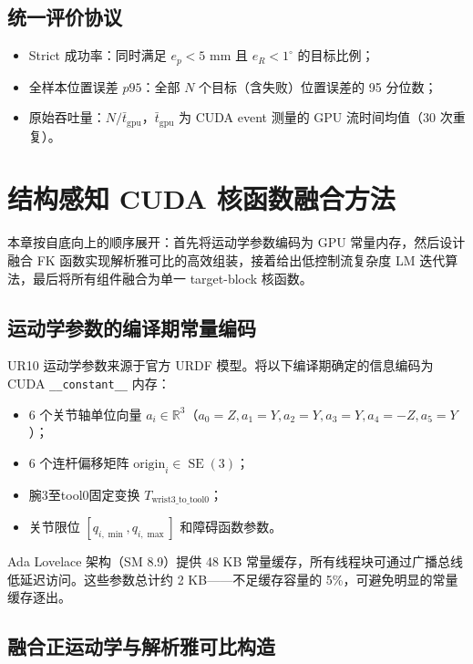 \documentclass[twocolumn,a4paper,10pt]{ctexart}
\DeclareMathOperator{\SE}{SE}
\newcommand{\R}{\mathbb{R}}
\begin{document}
\subsection{统一评价协议}

\begin{itemize}
  \item Strict 成功率：同时满足 $e_p<5$ mm 且 $e_R<1^\circ$ 的目标比例；
  \item 全样本位置误差 $p95$：全部 $N$ 个目标（含失败）位置误差的 95 分位数；
  \item 原始吞吐量：$N/\bar{t}_{\mathrm{gpu}}$，$\bar{t}_{\mathrm{gpu}}$ 为 CUDA event 测量的 GPU 流时间均值（30 次重复）。
\end{itemize}

\section{结构感知 CUDA 核函数融合方法}

本章按自底向上的顺序展开：首先将运动学参数编码为 GPU 常量内存，然后设计融合 FK 函数实现解析雅可比的高效组装，接着给出低控制流复杂度 LM 迭代算法，最后将所有组件融合为单一 target-block 核函数。

\subsection{运动学参数的编译期常量编码}

UR10 运动学参数来源于官方 URDF 模型\cite{urdf}。将以下编译期确定的信息编码为 CUDA \texttt{\_\_constant\_\_} 内存：

\begin{itemize}
  \item 6 个关节轴单位向量 $a_i\in\R^3$（$a_0=Z,a_1=Y,a_2=Y,a_3=Y,a_4=-Z,a_5=Y$）；
  \item 6 个连杆偏移矩阵 $\mathrm{origin}_i\in\SE(3)$；
  \item 腕3至tool0固定变换 $T_{\mathrm{wrist3\_to\_tool0}}$；
  \item 关节限位 $[q_{i,\min},q_{i,\max}]$ 和障碍函数参数。
\end{itemize}

Ada Lovelace 架构（SM 8.9）提供 48 KB 常量缓存，所有线程块可通过广播总线低延迟访问。这些参数总计约 2 KB——不足缓存容量的 5\%，可避免明显的常量缓存逐出。

\subsection{融合正运动学与解析雅可比构造}
\end{document}
